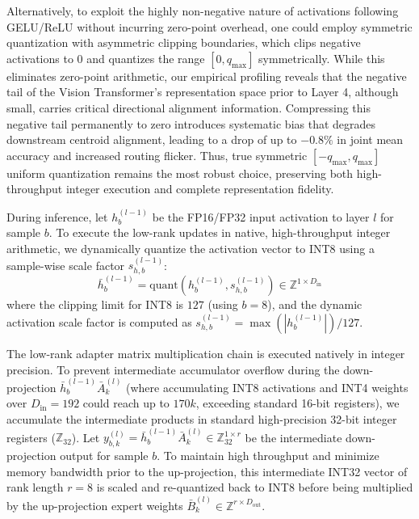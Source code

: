 Alternatively, to exploit the highly non-negative nature of activations following GELU/ReLU without incurring zero-point overhead, one could employ symmetric quantization with asymmetric clipping boundaries, which clips negative activations to $0$ and quantizes the range $[0, q_{\text{max}}]$ symmetrically. While this eliminates zero-point arithmetic, our empirical profiling reveals that the negative tail of the Vision Transformer's representation space prior to Layer 4, although small, carries critical directional alignment information. Compressing this negative tail permanently to zero introduces systematic bias that degrades downstream centroid alignment, leading to a drop of up to $-0.8\%$ in joint mean accuracy and increased routing flicker. Thus, true symmetric $[-q_{\text{max}}, q_{\text{max}}]$ uniform quantization remains the most robust choice, preserving both high-throughput integer execution and complete representation fidelity.

During inference, let $h_b^{(l-1)}$ be the FP16/FP32 input activation to layer $l$ for sample $b$. To execute the low-rank updates in native, high-throughput integer arithmetic, we dynamically quantize the activation vector to INT8 using a sample-wise scale factor $s_{h, b}^{(l-1)}$:
\begin{equation}
  \bar{h}_b^{(l-1)} = \text{quant}\left(h_b^{(l-1)}, s_{h, b}^{(l-1)}\right) \in \mathbb{Z}^{1 \times D_{\text{in}}}
\end{equation}
where the clipping limit for INT8 is $127$ (using $b=8$), and the dynamic activation scale factor is computed as $s_{h, b}^{(l-1)} = \max(|h_b^{(l-1)}|) / 127$.

The low-rank adapter matrix multiplication chain is executed natively in integer precision. To prevent intermediate accumulator overflow during the down-projection $\bar{h}_b^{(l-1)} \bar{A}_k^{(l)}$ (where accumulating INT8 activations and INT4 weights over $D_{\text{in}} = 192$ could reach up to $170k$, exceeding standard 16-bit registers), we accumulate the intermediate products in standard high-precision 32-bit integer registers ($\mathbb{Z}_{32}$). Let $y_{b, k}^{(l)} = \bar{h}_b^{(l-1)} \bar{A}_k^{(l)} \in \mathbb{Z}_{32}^{1 \times r}$ be the intermediate down-projection output for sample $b$. To maintain high throughput and minimize memory bandwidth prior to the up-projection, this intermediate INT32 vector of rank length $r=8$ is scaled and re-quantized back to INT8 before being multiplied by the up-projection expert weights $\bar{B}_k^{(l)} \in \mathbb{Z}^{r \times D_{\text{out}}}$.

